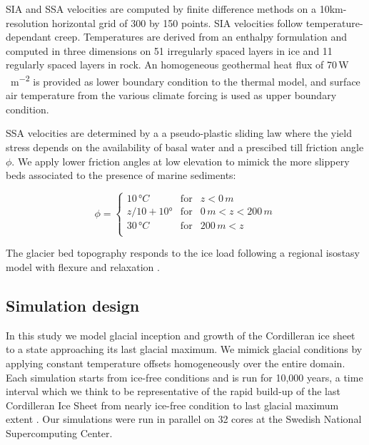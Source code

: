 SIA and SSA velocities are computed by finite difference methods on a 10km-resolution horizontal grid of 300 by 150 points. SIA velocities follow temperature-dependant creep. Temperatures are derived from an enthalpy formulation \citep{aschwanden-etal-2012} and computed in three dimensions on 51 irregularly spaced layers in ice and 11 regularly spaced layers in rock. An homogeneous geothermal heat flux of 70\,\unit{W\,m^{-2}} is provided as lower boundary condition to the thermal model, and surface air temperature from the various climate forcing is used as upper boundary condition.

SSA velocities are determined by a a pseudo-plastic sliding law where the yield stress depends on the availability of basal water and a prescibed till friction angle$\phi$. We apply lower friction angles at low elevation to mimick the more slippery beds associated to the presence of marine sediments:

\begin{equation}
	\phi = \left\{\begin{array}{llc}
		10\,\unit{\degree C} & \mathrm{for} &               z<  0\,\unit{m} \\
		z/10 + 10°           & \mathrm{for} &   0\,\unit{m}<z<200\,\unit{m} \\
		30\,\unit{\degree C} & \mathrm{for} & 200\,\unit{m}<z               \\
	\end{array}\right.
\end{equation}

The glacier bed topography responds to the ice load following a regional isostasy model with flexure and relaxation \citep{lingle-clark-1985}.

\subsection{Simulation design}

In this study we model glacial inception and growth of the Cordilleran ice sheet to a state approaching its last glacial maximum. We mimick glacial conditions by applying constant temperature offsets homogeneously over the entire domain. Each simulation starts from ice-free conditions and is run for 10,000 years, a time interval which we think to be representative of the rapid build-up of the last Cordilleran Ice Sheet from nearly ice-free condition to last glacial maximum extent \needref. Our simulations were run in parallel on 32 cores at the Swedish National Supercomputing Center.

